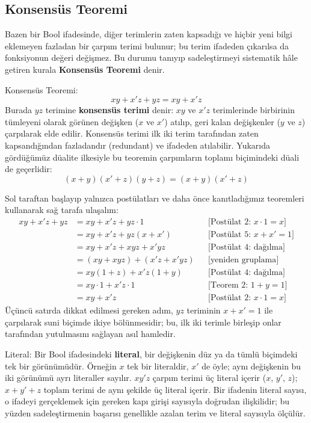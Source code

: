 \subsection{Konsensüs Teoremi}
\label{sec:konsensus}

Bazen bir Bool ifadesinde, diğer terimlerin zaten kapsadığı ve hiçbir yeni bilgi
eklemeyen fazladan bir çarpım terimi bulunur; bu terim ifadeden çıkarılsa da
fonksiyonun değeri değişmez. Bu durumu tanıyıp sadeleştirmeyi sistematik hâle
getiren kurala \textbf{Konsensüs Teoremi} denir.

\begin{tanim}{Konsensüs Teoremi:}
$$xy + x'z + yz = xy + x'z$$
Burada $yz$ terimine \textbf{konsensüs terimi} denir: $xy$ ve $x'z$ terimlerinde
birbirinin tümleyeni olarak görünen değişken ($x$ ve $x'$) atılıp, geri kalan
değişkenler ($y$ ve $z$) çarpılarak elde edilir. Konsensüs terimi ilk iki terim
tarafından zaten kapsandığından fazladandır (redundant) ve ifadeden atılabilir.
Yukarıda gördüğümüz düalite ilkesiyle bu teoremin çarpımların toplamı biçimindeki
düali de geçerlidir:
$$(x+y)(x'+z)(y+z) = (x+y)(x'+z)$$
\end{tanim}

\begin{ornek}
Sol taraftan başlayıp yalnızca postülatları ve daha önce kanıtladığımız
teoremleri kullanarak sağ tarafa ulaşalım:
\begin{align*}
xy + x'z + yz &= xy + x'z + yz\cdot 1 & &\text{[Postülat 2: } x\cdot 1=x \text{]}\\
    &= xy + x'z + yz(x+x') & &\text{[Postülat 5: } x+x'=1 \text{]}\\
    &= xy + x'z + xyz + x'yz & &\text{[Postülat 4: dağılma]}\\
    &= (xy+xyz) + (x'z+x'yz) & &\text{[yeniden gruplama]}\\
    &= xy(1+z) + x'z(1+y) & &\text{[Postülat 4: dağılma]}\\
    &= xy\cdot 1 + x'z\cdot 1 & &\text{[Teorem 2: } 1+y=1 \text{]}\\
    &= xy + x'z & &\text{[Postülat 2: } x\cdot 1=x \text{]}
\end{align*}
Üçüncü satırda dikkat edilmesi gereken adım, $yz$ teriminin $x+x'=1$ ile
çarpılarak suni biçimde ikiye bölünmesidir; bu, ilk iki terimle birleşip onlar
tarafından yutulmasını sağlayan asıl hamledir.
\end{ornek}

\begin{tanim}{Literal:}
Bir Bool ifadesindeki \textbf{literal}, bir değişkenin düz ya da tümlü
biçimdeki tek bir görünümüdür. Örneğin $x$ tek bir literaldir, $x'$ de öyle; aynı
değişkenin bu iki görünümü ayrı literaller sayılır. $xy'z$ çarpım terimi üç literal
içerir ($x$, $y'$, $z$); $x+y'+z$ toplam terimi de aynı şekilde üç literal içerir. Bir
ifadenin literal sayısı, o ifadeyi gerçeklemek için gereken kapı girişi sayısıyla
doğrudan ilişkilidir; bu yüzden sadeleştirmenin başarısı genellikle azalan terim ve
literal sayısıyla ölçülür.
\end{tanim}

